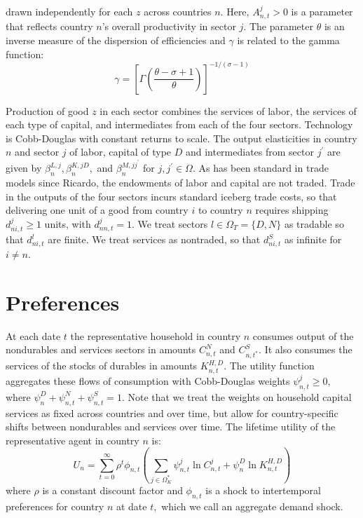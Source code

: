 \documentclass[12pt, bibtotoc, tablecaptionabove, figurecaptionabove, fleqn]{article}
\begin{document}
drawn independently for each $z$ across countries $n .$ Here, $A_{n, t}^{j}>0$ is a parameter that reflects country $n$'s overall productivity in sector $j$. The parameter $\theta$ is an inverse measure of the dispersion of efficiencies and $\gamma$ is related to the gamma function:
\begin{equation*}
	\gamma=\left[\Gamma\left(\frac{\theta-\sigma+1}{\theta}\right)\right]^{-1 /(\sigma-1)}
\end{equation*}


Production of good $z$ in each sector combines the services of labor, the services of each type of capital, and intermediates from each of the four sectors. Technology is Cobb-Douglas with constant returns to scale. The output elasticities in country $n$ and sector $j$ of labor, capital of type $D$ and intermediates from sector $j^{\prime}$ are given by $\beta_{n}^{L, j}, \beta_{n}^{K, j D},$ and $\beta_{n}^{M, j j^{\prime}}$ for $j, j^{\prime} \in \Omega$. As has been standard in trade models since Ricardo, the endowments of labor and capital are not traded. Trade in the outputs of the four sectors incurs standard iceberg trade costs, so that delivering one unit of a good from country $i$ to country $n$ requires shipping $d_{n i, t}^{j} \geq 1$ units, with $d_{n n, t}^{j}=1 .$ We treat sectors $l \in \Omega_{T}=\{D, N\}$ as tradable so that $d_{n i, t}^{l}$ are finite. We treat services as nontraded, so that $d_{n i, t}^{S}$
as infinite for $i \neq n$.

\section{Preferences}
At each date $t$ the representative household in country $n$ consumes output of the nondurables and services sectors in amounts $C_{n, t}^{N}$ and $C_{n, t^{*}}^{S}$. It also consumes the services of the stocks of durables in amounts $K_{n, t}^{H, D}$. The utility function aggregates these flows of consumption with Cobb-Douglas weights $\psi_{n, t}^{j} \geq 0,$ where $\psi^{D}_n+\psi_{n, t}^{N}+\psi_{n, t}^{S}=1 .$ Note that
we treat the weights on household capital services as fixed across countries and over time, but allow for country-specific shifts between nondurables and services over time. The lifetime utility of the representative agent in country $n$ is:
$$
U_{n}=\sum_{t=0}^{\infty} \rho^{t} \phi_{n, t}\left(\sum_{j \in \Omega_{K}^{*}} \psi_{n, t}^{j} \ln C_{n, t}^{j}+ \psi^{D}_n \ln K_{n, t}^{H, D}\right)
$$
where $\rho$ is a constant discount factor and $\phi_{n, t}$ is a shock to intertemporal preferences for country
$n$ at date $t,$ which we call an aggregate demand shock.
\end{document}

